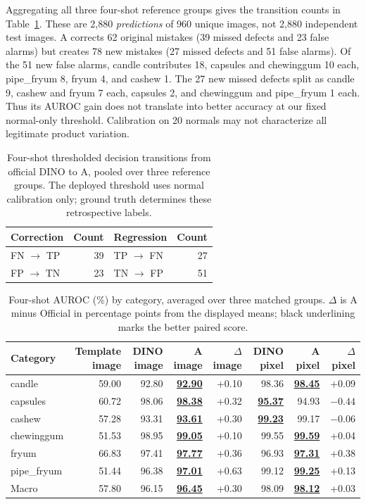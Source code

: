 \documentclass[times,10pt,twocolumn,letterpaper]{article}
\newcommand{\bestscore}[1]{\underline{\textbf{#1}}}
\begin{document}
Aggregating all three four-shot reference groups gives the transition counts in Table~\ref{tab:transitions}. These are 2,880 \emph{predictions} of 960 unique images, not 2,880 independent test images. A corrects 62 original mistakes (39 missed defects and 23 false alarms) but creates 78 new mistakes (27 missed defects and 51 false alarms). Of the 51 new false alarms, candle contributes 18, capsules and chewinggum 10 each, pipe\_fryum 8, fryum 4, and cashew 1. The 27 new missed defects split as candle 9, cashew and fryum 7 each, capsules 2, and chewinggum and pipe\_fryum 1 each. Thus its AUROC gain does not translate into better accuracy at our fixed normal-only threshold. Calibration on 20 normals may not characterize all legitimate product variation.

\begin{table}[t]
\centering
\caption{Four-shot thresholded decision transitions from official DINO to A, pooled over three reference groups. The deployed threshold uses normal calibration only; ground truth determines these retrospective labels.}
\label{tab:transitions}
\small
\begin{tabular}{l r l r}
\toprule
Correction & Count & Regression & Count\\
\midrule
FN $\rightarrow$ TP & 39 & TP $\rightarrow$ FN & 27\\
FP $\rightarrow$ TN & 23 & TN $\rightarrow$ FP & 51\\
\bottomrule
\end{tabular}
\end{table}

\begin{table}[t]
\centering
\caption{Four-shot AUROC (\%) by category, averaged over three matched groups. $\Delta$ is A minus Official in percentage points from the displayed means; black underlining marks the better paired score.}
\label{tab:category}
\small
\setlength{\tabcolsep}{3.7pt}
\begin{tabular}{l r rrr rrr}
\toprule
Category & Template image & DINO image & A image & $\Delta$ image & DINO pixel & A pixel & $\Delta$ pixel\\
\midrule
candle & 59.00 & 92.80 & \bestscore{92.90} & +0.10 & 98.36 & \bestscore{98.45} & +0.09\\
capsules & 60.72 & 98.06 & \bestscore{98.38} & +0.32 & \bestscore{95.37} & 94.93 & $-0.44$\\
cashew & 57.28 & 93.31 & \bestscore{93.61} & +0.30 & \bestscore{99.23} & 99.17 & $-0.06$\\
chewinggum & 51.53 & 98.95 & \bestscore{99.05} & +0.10 & 99.55 & \bestscore{99.59} & +0.04\\
fryum & 66.83 & 97.41 & \bestscore{97.77} & +0.36 & 96.93 & \bestscore{97.31} & +0.38\\
pipe\_fryum & 51.44 & 96.38 & \bestscore{97.01} & +0.63 & 99.12 & \bestscore{99.25} & +0.13\\
\midrule
Macro & 57.80 & 96.15 & \bestscore{96.45} & +0.30 & 98.09 & \bestscore{98.12} & +0.03\\
\bottomrule
\end{tabular}
\end{table}
\end{document}
